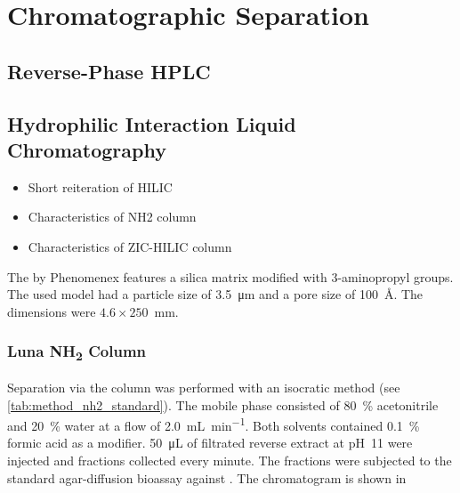 
\section{Chromatographic Separation} %
\label{sec:results_chromatographic_separation}

    \subsection{Reverse-Phase HPLC} %
    \label{sub:results_reverse_phase_hplc}


    \subsection{Hydrophilic Interaction Liquid Chromatography} %
    \label{sub:results_hydrophilic_interaction_chromatography}
    
	\begin{itemize}
		\item Short reiteration of HILIC
		\item Characteristics of NH2 column
		\item Characteristics of ZIC-HILIC column
	\end{itemize}

	The \luna by Phenomenex features a silica matrix modified with 3-aminopropyl groups. The used model had a particle size of \SI{3.5}{\micro\meter} and a pore size of 100~\AA. The dimensions were $4.6\times250$~mm.
    
	    \subsubsection{Luna NH\textsubscript{2} Column}
	    
	    Separation via the \luna column was performed with an isocratic method (see \ref{tab:method_nh2_standard}). The mobile phase consisted of 80~\% acetonitrile and 20~\% water at a flow of \SI{2.0}{\milli\liter\per\minute}. Both solvents contained 0.1~\% formic acid as a modifier. \SI{50}{\micro\liter} of filtrated reverse extract at pH~11 were injected and fractions collected every minute. The fractions were subjected to the standard agar-diffusion bioassay against \coli. The chromatogram is shown in 
	    
	    

